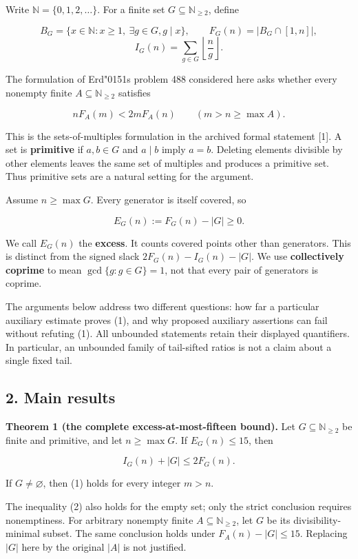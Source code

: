 \documentclass[
  11pt,
]{article}
\newcommand{\odoubleacute}{{\accentfont\char"0151}}
\begin{document}
Write \(\mathbb N=\{0,1,2,\ldots\}\). For a finite set
\(G\subseteq\mathbb N_{\ge2}\), define

\[
B_G=\{x\in\mathbb N:x\ge1,\ \exists g\in G, g\mid x\},\qquad
F_G(n)=|B_G\cap[1,n]|,
\] \[
I_G(n)=\sum_{g\in G}\left\lfloor\frac ng\right\rfloor.
\]

The formulation of Erd\texorpdfstring{\odoubleacute}{o}s problem 488 considered here asks whether every
nonempty finite \(A\subseteq\mathbb N_{\ge2}\) satisfies

\[
\boxed{\quad nF_A(m)<2mF_A(n)\qquad(m>n\ge\max A).\quad} \tag{1}
\]

This is the sets-of-multiples formulation in the archived formal
statement {[}1{]}. A set is \textbf{primitive} if \(a,b\in G\) and
\(a\mid b\) imply \(a=b\). Deleting elements divisible by other elements
leaves the same set of multiples and produces a primitive set. Thus
primitive sets are a natural setting for the argument.

Assume \(n\ge\max G\). Every generator is itself covered, so

\[
E_G(n):=F_G(n)-|G|\ge0.
\]

We call \(E_G(n)\) the \textbf{excess}. It counts covered points other
than generators. This is distinct from the signed slack
\(2F_G(n)-I_G(n)-|G|\). We use \textbf{collectively coprime} to mean
\(\gcd\{g:g\in G\}=1\), not that every pair of generators is coprime.

The arguments below address two different questions: how far a
particular auxiliary estimate proves (1), and why proposed auxiliary
assertions can fail without refuting (1). All unbounded statements
retain their displayed quantifiers. In particular, an unbounded family
of tail-sifted ratios is not a claim about a single fixed tail.

\hypertarget{main-results}{%
\subsection{2. Main results}\label{main-results}}

\textbf{Theorem 1 (the complete excess-at-most-fifteen bound).} Let
\(G\subseteq\mathbb N_{\ge2}\) be finite and primitive, and let
\(n\ge\max G\). If \(E_G(n)\le15\), then

\[
I_G(n)+|G|\le2F_G(n). \tag{2}
\]

If \(G\ne\varnothing\), then (1) holds for every integer \(m>n\).

The inequality (2) also holds for the empty set; only the strict
conclusion requires nonemptiness. For arbitrary nonempty finite
\(A\subseteq\mathbb N_{\ge2}\), let \(G\) be its divisibility-minimal
subset. The same conclusion holds under \(F_A(n)-|G|\le15\). Replacing
\(|G|\) here by the original \(|A|\) is not justified.
\end{document}
